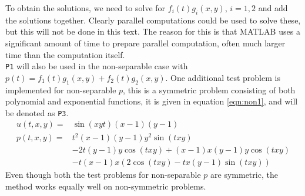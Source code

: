 To obtain the solutions, we need to solve for $f_i(t) g_i(x,y)$, $i = 1,2 $ and add the solutions together. Clearly parallel computations could be used to solve these, but this will not be done in this text. The reason for this is that MATLAB uses a significant amount of time to prepare parallel computation, often much larger time than the computation itself.\\

\texttt{P1} will also be used in the non-separable case with $p(t) = f_1(t) g_1(x,y) + f_2(t) g_2(x,y)$.
One additional test problem is implemented for non-separable $p$, this is a symmetric problem consisting of both polynomial and exponential functions, it is given in equation \eqref{eqn:non1}, and will be denoted as \texttt{P3}.
\begin{equation} \label{eqn:non1}
\begin{aligned}
 u(t,x,y) = & \sin(x y t) (x-1) (y-1)\\
 p(t,x,y) = & t^2 (x-1) (y-1) y^2 \sin(t x y)\\ & -2 t (y-1) y \cos(t x y)+(x-1) x (y-1) y \cos(t x y)\\ & -t (x-1) x (2 \cos(t x y)-t x (y-1) \sin(t x y))
\end{aligned}
\end{equation}
Even though both the test problems for non-separable $p$ are symmetric, the method works equally well on non-symmetric problems. 
